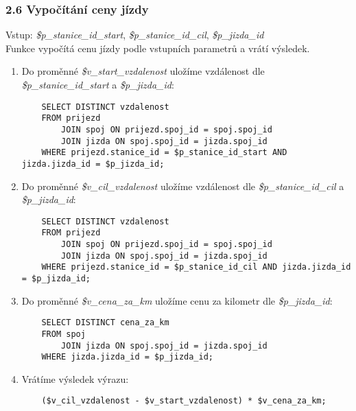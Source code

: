 \documentclass[11pt]{article}
\begin{document}
\newpage

\subsubsection*{2.6 Vypočítání ceny jízdy}
Vstup: \textit{\$p\_stanice\_id\_start}, \textit{\$p\_stanice\_id\_cil}, \textit{\$p\_jizda\_id}\\
Funkce vypočítá cenu jízdy podle vstupních parametrů a vrátí výsledek.

\begin{enumerate}
    \item Do proměnné \textit{\$v\_start\_vzdalenost} uložíme vzdálenost dle \textit{\$p\_stanice\_id\_start} a \textit{\$p\_jizda\_id}:
    \begin{lstlisting}
    SELECT DISTINCT vzdalenost
    FROM prijezd
        JOIN spoj ON prijezd.spoj_id = spoj.spoj_id
        JOIN jizda ON spoj.spoj_id = jizda.spoj_id
    WHERE prijezd.stanice_id = $p_stanice_id_start AND jizda.jizda_id = $p_jizda_id;
    \end{lstlisting}
    
    \item Do proměnné \textit{\$v\_cil\_vzdalenost} uložíme vzdálenost dle \textit{\$p\_stanice\_id\_cil} a \textit{\$p\_jizda\_id}:
    \begin{lstlisting}
    SELECT DISTINCT vzdalenost
    FROM prijezd
        JOIN spoj ON prijezd.spoj_id = spoj.spoj_id
        JOIN jizda ON spoj.spoj_id = jizda.spoj_id
    WHERE prijezd.stanice_id = $p_stanice_id_cil AND jizda.jizda_id = $p_jizda_id;
    \end{lstlisting}

    \item Do proměnné \textit{\$v\_cena\_za\_km} uložíme cenu za kilometr dle \textit{\$p\_jizda\_id}:
    \begin{lstlisting}
    SELECT DISTINCT cena_za_km
    FROM spoj
        JOIN jizda ON spoj.spoj_id = jizda.spoj_id
    WHERE jizda.jizda_id = $p_jizda_id;
    \end{lstlisting}

    \item Vrátíme výsledek výrazu:
    \begin{lstlisting}
    ($v_cil_vzdalenost - $v_start_vzdalenost) * $v_cena_za_km;
    \end{lstlisting}
\end{enumerate}
\end{document}
